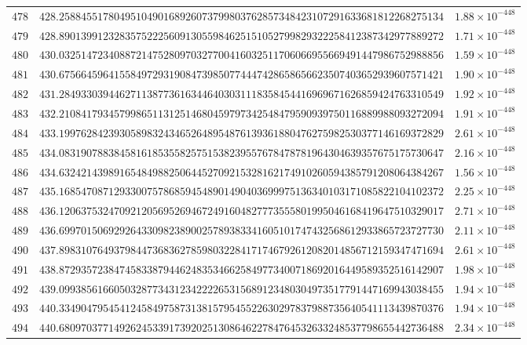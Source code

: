 \documentclass[12pt,reqno]{amsart}
\theoremstyle{remark}
\begin{document}
\begin{longtable}{clc}
$478$ & $428.2588455178049510490168926073799803762857348423107291633681812268275134$ & $1.88\times 10^{-448}$ \\
$479$ & $428.8901399123283575222560913055984625151052799829322258412387342977889272$ & $1.71\times 10^{-448}$ \\
$480$ & $430.0325147234088721475280970327700416032511706066955669491447986752988856$ & $1.59\times 10^{-448}$ \\
$481$ & $430.6756645964155849729319084739850774447428658656623507403652939607571421$ & $1.90\times 10^{-448}$ \\
$482$ & $431.2849330394462711387736163446403031118358454416969671626859424763310549$ & $1.92\times 10^{-448}$ \\
$483$ & $432.2108417934579986511312514680459797342548479590939750116889988093272094$ & $1.91\times 10^{-448}$ \\
$484$ & $433.1997628423930589832434652648954876139361880476275982530377146169372829$ & $2.61\times 10^{-448}$ \\
$485$ & $434.0831907883845816185355825751538239557678478781964304639357675175730647$ & $2.16\times 10^{-448}$ \\
$486$ & $434.6324214398916548498825064452709215328162174910260594385791208064384267$ & $1.56\times 10^{-448}$ \\
$487$ & $435.1685470871293300757868594548901490403699975136340103171085822104102372$ & $2.25\times 10^{-448}$ \\
$488$ & $436.1206375324709212056952694672491604827773555801995046168419647510329017$ & $2.71\times 10^{-448}$ \\
$489$ & $436.6997015069292643309823890025789383341605101747432568612933865723727730$ & $2.11\times 10^{-448}$ \\
$490$ & $437.8983107649379844736836278598032284171746792612082014856712159347471694$ & $2.61\times 10^{-448}$ \\
$491$ & $438.8729357238474583387944624835346625849773400718692016449589352516142907$ & $1.98\times 10^{-448}$ \\
$492$ & $439.0993856166050328773431234222265315689123480304973517791447169943038455$ & $1.94\times 10^{-448}$ \\
$493$ & $440.3349047954541245849758731381579545522630297837988735640541113439870376$ & $1.94\times 10^{-448}$ \\
$494$ & $440.6809703771492624533917392025130864622784764532633248537798655442736488$ & $2.34\times 10^{-448}$ \\

\end{longtable}
\end{document}
